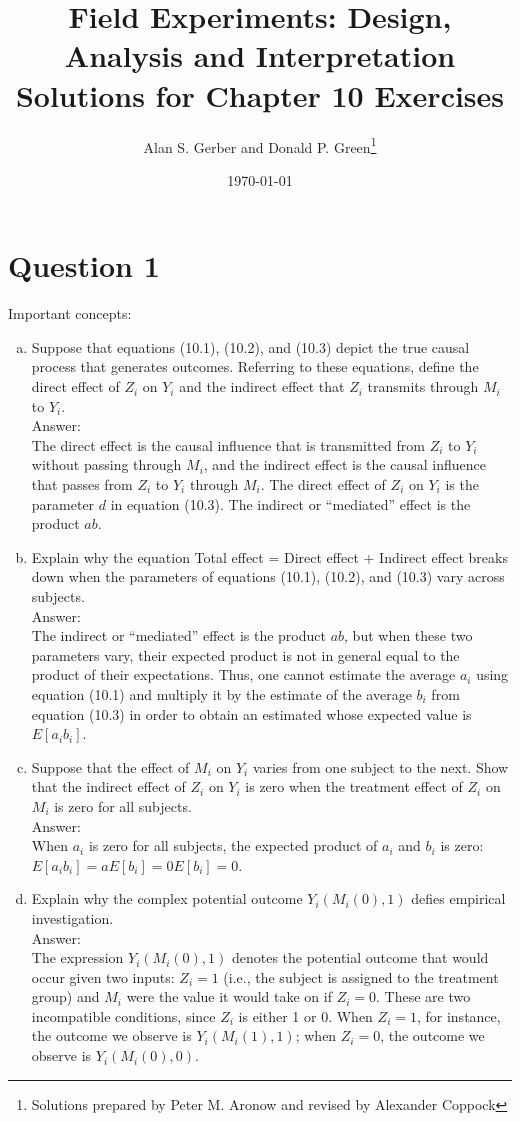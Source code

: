 \documentclass[11pt,notitlepage]{article}\usepackage[]{graphicx}\usepackage[]{color}
\title{Field Experiments: Design, Analysis and Interpretation \\
Solutions for Chapter 10 Exercises}
\author{Alan S. Gerber and Donald P. Green\footnote{Solutions prepared by Peter M. Aronow and revised by Alexander Coppock}}
\date{\today}
\begin{document}
\maketitle


\section*{Question 1}
Important concepts:

\begin{enumerate}[a)]
\item Suppose that equations (10.1), (10.2), and (10.3) depict the true causal process that generates outcomes. Referring to these equations, define the direct effect of $Z_i$ on $Y_i$ and the indirect effect that $Z_i$ transmits through $M_i$ to $Y_i$.\\
Answer:\\
The direct effect is the causal influence that is transmitted from $Z_i$ to $Y_i$ without passing through $M_i$, and the indirect effect is the causal influence that passes from $Z_i$ to $Y_i$ through $M_i$. The direct effect of $Z_i$ on $Y_i$ is the parameter $d$ in equation (10.3).  The indirect or ``mediated'' effect is the product $ab$.


\item Explain why the equation Total effect = Direct effect + Indirect effect breaks down when the parameters of equations (10.1), (10.2), and (10.3) vary across subjects.\\
Answer:\\
The indirect or ``mediated'' effect is the product $ab$, but when these two parameters vary, their expected product is not in general equal to the product of their expectations.  Thus, one cannot estimate the average $a_i$ using equation (10.1) and multiply it by the estimate of the average $b_i$ from equation (10.3) in order to obtain an estimated whose expected value is $E[a_i b_i]$.  

\item Suppose that the effect of $M_i$ on $Y_i$ varies from one subject to the next. Show that the indirect effect of $Z_i$ on $Y_i$ is zero when the treatment effect of $Z_i$ on $M_i$ is zero for all subjects.\\
Answer:\\
When $a_i$ is zero for all subjects, the expected product of $a_i$ and $b_i$ is zero:  $E[a_i b_i]=aE[b_i]= 0E[b_i]=0$.   

\item Explain why the complex potential outcome $Y_i(M_i(0),1)$ defies empirical investigation.\\
Answer:\\
The expression $Y_i (M_i (0),1)$ denotes the potential outcome that would occur given two inputs: $Z_i=1$ (i.e., the subject is assigned to the treatment group) and $M_i$ were the value it would take on if $Z_i=0$. These are two incompatible conditions, since $Z_i$ is either 1 or 0. When $Z_i=1$, for instance, the outcome we observe is $Y_i (M_i (1),1)$; when $Z_i=0$, the outcome we observe is $Y_i (M_i (0),0)$.


\end{enumerate}
\end{document}
